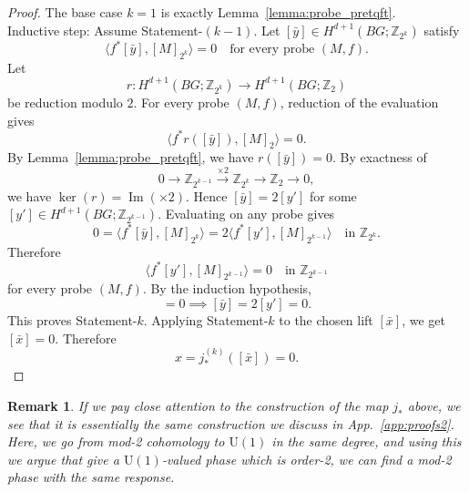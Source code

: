 \documentclass[aps,prx,reprint,superscriptaddress,twocolumn,amsmath,amssymb,amsfonts, nofootinbib]{revtex4-2}
\newcommand{\U}{\text{U}}
\theoremstyle{apsstyle}
\newtheorem{remark}[theorem]{Remark}
\begin{document}
\begin{proof}
\noindent The base case $k=1$ is exactly Lemma~\ref{lemma:probe_pretqft}.\\
\noindent Inductive step: Assume Statement-$(k-1)$. Let $[\bar y]\in H^{d+1}(BG;\mathbb Z_{2^k})$
satisfy
\begin{equation*}
\langle f^*[\bar y],[M]_{2^k}\rangle=0 \quad\text{for every probe }(M,f).
\end{equation*}
Let
\begin{equation*}
r:H^{d+1}(BG;\mathbb Z_{2^k}) \to H^{d+1}(BG;\mathbb Z_2)
\end{equation*}
be reduction modulo $2$. For every probe $(M,f)$, reduction of the
evaluation gives
\begin{equation*}
\big\langle f^*r([\bar y]),[M]_2\big\rangle=0.
\end{equation*}
By Lemma~\ref{lemma:probe_pretqft}, we have $r([\bar y])=0$. By exactness of
\begin{equation*}
0\to \mathbb Z_{2^{k-1}} \xrightarrow{\times 2} \mathbb Z_{2^k} \to \mathbb Z_2 \to0,
\end{equation*}
we have $\ker(r)=\operatorname{Im}(\times2)$.
Hence $[\bar y]=2[y']$
for some $[y']\in H^{d+1}(BG;\mathbb Z_{2^{k-1}})$. Evaluating on any probe gives
\begin{equation*}
0 = \langle f^*[\bar y],[M]_{2^k}\rangle =
2\langle f^*[y'],[M]_{2^{k-1}}\rangle
\quad \text{in }\mathbb Z_{2^k}.
\end{equation*}
Therefore
\begin{equation*}
\langle f^*[y'],[M]_{2^{k-1}}\rangle=0
\quad
\text{in }\mathbb Z_{2^{k-1}}
\end{equation*}
for every probe $(M,f)$. By the induction hypothesis,
\begin{equation*}
[y']=0 \implies  [\bar y]=2[y']=0.
\end{equation*}
This proves Statement-$k$. Applying Statement-$k$ to the chosen lift $[\bar x]$, we get $[\bar x]=0$. Therefore
\begin{equation*}
x=j^{(k)}_*([\bar x])=0.
\end{equation*}
\end{proof}

\begin{remark}
If we pay close attention to the construction of the map $j_{*}$ above, we see that it is essentially the same construction we discuss in App.~\ref{app:proofs2}. Here, we go from mod-2 cohomology to $\U(1)$ in the same degree, and using this we argue that give a $\U(1)$-valued phase which is order-2, we can find a mod-2 phase with the same response. 
\end{remark}
\end{document}
